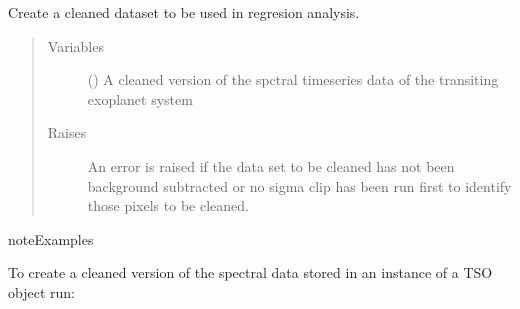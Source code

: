 \documentclass[a4paper,10pt,english]{sphinxmanual}
\begin{document}
\begin{fulllineitems}
\begin{fulllineitems}
\end{fulllineitems}


\begin{fulllineitems}
\label{\detokenize{cascade.TSO:cascade.TSO.TSO.TSOSuite.create_cleaned_dataset}}
Create a cleaned dataset to be used in regresion analysis.
\begin{quote}\begin{description}
\item[{Variables}] \leavevmode
{} () \textendash{} A cleaned version of the spctral timeseries data of the transiting
exoplanet system

\item[{Raises}] \leavevmode
{} \textendash{} An error is raised if the data set to be cleaned has not been
background subtracted or no sigma clip has been run first to
identify those pixels to be cleaned.

\end{description}\end{quote}

\begin{sphinxadmonition}{note}{Examples}

To create a cleaned version of the spectral data stored in an instance
of a TSO object run:

%
\begin{sphinxVerbatim}[commandchars=\\\{\}]
\end{sphinxVerbatim}
\end{sphinxadmonition}

\end{fulllineitems}



\end{fulllineitems}
\end{document}
